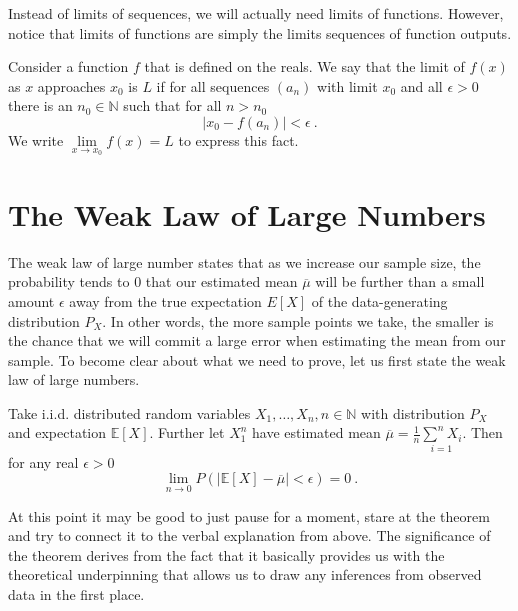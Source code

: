 Instead of limits of sequences, we will actually need limits of functions. However, notice that limits of functions are simply the limits sequences of function
outputs. 

\begin{Definition}
Consider a function $ f $ that is defined on the reals. We say that the limit of $ f(x) $ as $ x $ approaches $ x_{0} $ is $ L $ if for all sequences 
$ \left( a_{n} \right) $ with limit $ x_{0} $ and all $ \epsilon > 0 $ there is an $ n_{0} \in \mathbb{N} $ such that for all $ n > n_{0} $ 
$$  | x_{0} - f\left(a_{n}\right) | < \epsilon \ .$$
We write $ \underset{x \rightarrow x_{0}}{\lim} f(x) = L $ to express this fact. \\
\end{Definition}

\section{The Weak Law of Large Numbers}
The weak law of large number states that as we increase our sample size, the probability tends to 0 that our estimated mean $ \overline{\mu} $ will be further than a small
amount $ \epsilon $ away from the true expectation $ E[X] $ of the data-generating distribution $ P_{X} $. In other words, the more sample points we take, 
the smaller is the chance that we will commit a large error when estimating the mean from our sample. To become clear about what we need to prove, let us first state
the weak law of large numbers.

\begin{Theorem}\label{weakLaw}
Take i.i.d. distributed random variables $ X_{1}, \ldots, X_{n}, n \in \mathbb{N} $ with distribution $ P_{X} $ and expectation $ \mathbb{E}[X] $. Further let
$ X_{1}^{n} $ have estimated mean $ \overline{\mu} = \frac{1}{n} \underset{i=1}{\overset{n}{\sum}X_{i}} $. Then for any real $ \epsilon > 0 $
$$ \underset{n \rightarrow 0}{\lim}P(|\mathbb{E}[X] - \overline{\mu}| < \epsilon) = 0 \ . $$
\end{Theorem}

At this point it may be good to just pause for a moment, stare at the theorem and try to connect it to the verbal explanation from above. The significance of the theorem
derives from the fact that it basically provides us with the theoretical underpinning that allows us to draw any inferences from observed data in the first place.

